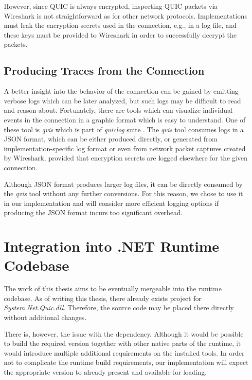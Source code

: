 However, since QUIC is always encrypted, inspecting QUIC packets via Wireshark is not
straightforward as for other network protocols. Implementations must leak the encryption secrets
used in the connection, e.g., in a log file, and these keys must be provided to Wireshark in order
to successfully decrypt the packets.

\subsection{Producing Traces from the Connection}

A better insight into the behavior of the connection can be gained by emitting verbose logs which
can be later analyzed, but such logs may be difficult to read and reason about. Fortunately, there
are tools which can visualize individual events in the connection in a graphic format which is easy
to understand. One of these tool is \textit{qvis} \cite{web:qvis} which is part of \textit{quiclog}
suite \cite{githubquiclog}. The \textit{qvis} tool consumes logs in a JSON format, which can be
either produced directly, or generated from implementation-specific log format or even from network
packet captures created by Wireshark, provided that encryption secrets are logged elsewhere for the
given connection.

Although JSON format produces larger log files, it can be directly consumed by the \textit{qvis}
tool without any further conversions. For this reason, we chose to use it in our implementation and
will consider more efficient logging options if producing the JSON format incurs too significant
overhead.

\section{Integration into .NET Runtime Codebase}

The work of this thesis aims to be eventually mergeable into the \dotnet{} runtime codebase. As of
writing this thesis, there already exists project for \textit{System.Net.Quic.dll}. Therefore, the
source code may be placed there directly without additional changes.

There is, however, the issue with the \libopenssl{} dependency. Although it would be possible to
build the required \libopenssl{} version together with other native parts of the \dotnet{} runtime,
it would introduce multiple additional requirements on the installed tools. In order not to
complicate the runtime build requirements, our implementation will expect the appropriate
\libopenssl{} version to already present and available for loading.

